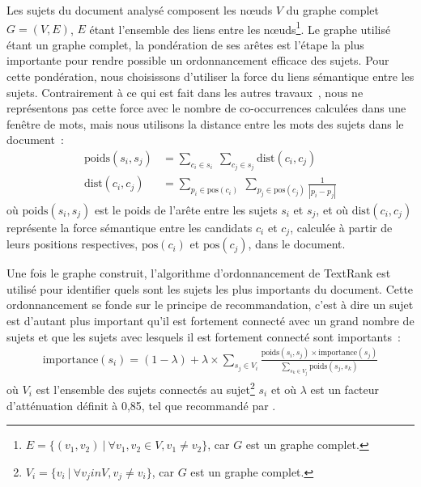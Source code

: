     Les sujets du document analysé composent les n\oe{}uds $V$ du graphe complet
    $G = (V, E)$, $E$ étant l'ensemble des liens entre les
    n\oe{}uds\footnote{$E = \{(v_1, v_2)\ |\ \forall{v_1, v_2 \in V}, v_1 \neq v_2\}$,
    car $G$ est un graphe complet.}. Le graphe utilisé étant un graphe complet,
    la pondération de ses arêtes est l'étape la plus importante pour rendre
    possible un ordonnancement efficace des sujets. Pour cette pondération, nous
    choisissons d'utiliser la force du liens sémantique entre les sujets.
    Contrairement à ce qui est fait dans les autres
    travaux~\cite{wan2008expandrank,tsatsaronis2010semanticrank,liu2010topicalpagerank},
    nous ne représentons pas cette force avec le nombre de co-occurrences
    calculées dans une fenêtre de mots, mais nous utilisons la distance entre 
    les mots des sujets dans le document~:
    \begin{align}
      \text{poids}(s_i, s_j) &= \sum_{c_i \in s_i}\ \sum_{c_j \in s_j} \text{dist}(c_i, c_j) \label{math:ponderation}\\
      \text{dist}(c_i, c_j) &= \sum_{p_i \in \text{pos}(c_i)}\ \sum_{p_j \in \text{pos}(c_j)} \frac{1}{|p_i - p_j|} \label{math:distance}
    \end{align}
    où $\text{poids}(s_i, s_j)$ est le poids de l'arête entre les sujets $s_i$
    et $s_j$, et où $\text{dist}(c_i, c_j)$ représente la force sémantique entre
    les candidats $c_i$ et $c_j$, calculée à partir de leurs positions
    respectives, $\text{pos}(c_i)$ et $\text{pos}(c_j)$, dans le document.

    Une fois le graphe construit, l'algorithme d'ordonnancement de TextRank est
    utilisé pour identifier quels sont les sujets les plus importants du
    document. Cette ordonnancement se fonde sur le principe de recommandation,
    c'est à dire un sujet est d'autant plus important qu'il est fortement
    connecté avec un grand nombre de sujets et que les sujets avec lesquels il
    est fortement connecté sont importants~:
    \begin{align}
      \text{importance}(s_i) = (1 - \lambda) + \lambda \times \sum_{s_j \in V_i} \frac{\text{poids}(s_i, s_j) \times \text{importance}(s_j)}{\sum_{s_k \in V_j} \text{poids}(s_j, s_k)} \label{math:textrank}
    \end{align}
    où $V_i$ est l'ensemble des sujets connectés au
    sujet\footnote{$V_i = \{v_i\ |\ \forall{v_j in V}, v_j \neq v_i\}$, car $G$
    est un graphe complet.} $s_i$ et où $\lambda$ est un facteur d'atténuation
    définit à 0,85, tel que recommandé par .


